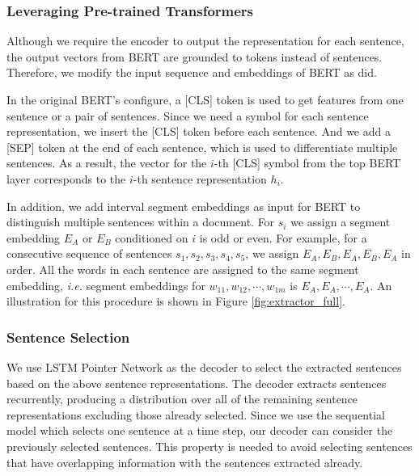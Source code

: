 \documentclass[11pt,a4paper]{article}
\begin{document}
\subsubsection{Leveraging Pre-trained Transformers}

Although we require the encoder
to output the representation for each sentence,
the output vectors from BERT are grounded to tokens
instead of sentences. Therefore, we modify the input
sequence and embeddings of BERT as \citet{liu2019fine} did.

In the original BERT's configure, a [CLS] token is used
to get features from one sentence or a pair of sentences.
Since we need a symbol for each sentence representation,
we insert the [CLS] token before each sentence. And we
add a [SEP] token at the end of each sentence, which is used to
differentiate multiple sentences. As a result, the vector for the $i$-th 
[CLS] symbol from the top BERT layer corresponds to the $i$-th sentence representation $h_i$.

In addition, we add interval segment embeddings as input for BERT
to distinguish multiple
sentences within a document. For $s_i$ we assign
a segment embedding $E_A$ or $E_B$ conditioned on $i$
is odd or even. For example, for a consecutive sequence of sentences $s_1, s_2, s_3, s_4, s_5$, 
we assign $E_A, E_B, E_A, E_B, E_A$ in order.
All the words in each sentence are assigned to the same
segment embedding, \emph{i.e.} segment embeddings for
$w_{11}, w_{12},\cdots,w_{1m}$ is $E_A,E_A,\cdots,E_A$.
An illustration for this procedure is shown in Figure \ref{fig:extractor_full}.

\subsubsection{Sentence Selection}

We use LSTM Pointer Network \cite{vinyals2015pointer}
as the decoder to select the extracted sentences
based on the above sentence representations. The decoder
extracts sentences recurrently, producing a distribution
over all of the remaining sentence representations
excluding those already selected.
Since we use the sequential model which selects
one sentence at a time step, our decoder
can consider the previously selected sentences.
This property is needed to avoid selecting sentences
that have overlapping information
with the sentences extracted already.
\end{document}
